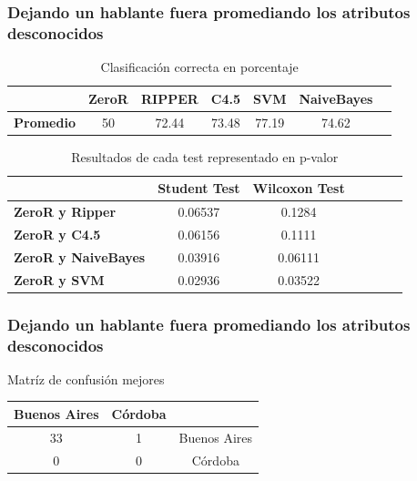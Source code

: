 \documentclass[mathserif]{beamer}%
\begin{document}
\begin{frame}
	\frametitle{Dejando un hablante fuera promediando los atributos desconocidos}
	
	\begin{table}[H]
		\centering
		\begin{tabular}{|l|c|c|c|c|c|c|}
			\hline
			\textbf{}  & \textbf{ZeroR} & \textbf{RIPPER} & \textbf{C4.5} & \textbf{SVM} & \textbf{NaiveBayes} \\ \hline
			\textbf{Promedio} & 50 & 72.44 & 73.48 & 77.19 & 74.62 \\ \hline
		\end{tabular}
		\caption{Clasificación correcta en porcentaje}
		\label{class_corr_en_pct}
	\end{table}	
	
	\begin{table}[H]
		\centering
		\begin{tabular}{|l|c|c|c|c|c|c|}
			\hline
			\textbf{}  & \textbf{Student Test} & \textbf{Wilcoxon Test} \\ \hline
			\textbf{ZeroR y Ripper}  & 0.06537 & 0.1284 \\ \hline
			\textbf{ZeroR y C4.5}  & 0.06156 &  0.1111 \\ \hline
			\textbf{ZeroR y NaiveBayes}  & 0.03916 & 0.06111 \\ \hline
			\textbf{ZeroR y SVM}  &  0.02936 & 0.03522 \\ \hline
		\end{tabular}
		\caption{Resultados de cada test representado en p-valor}
		\label{res_tests_wilcoxon_student}
	\end{table}
		
\end{frame}

\begin{frame}
	\frametitle{Dejando un hablante fuera promediando los atributos desconocidos}
	
	Matríz de confusión mejores
	
	\begin{table}[H]
		\centering
		\begin{tabular}{|c|c|c|}
			\hline
			Buenos Aires & Córdoba & \\ \hline
			33 & 1 & Buenos Aires\\ \hline
			0 & 0 & Córdoba\\ \hline
		\end{tabular}
	\end{table}
\end{frame}
\end{document}
